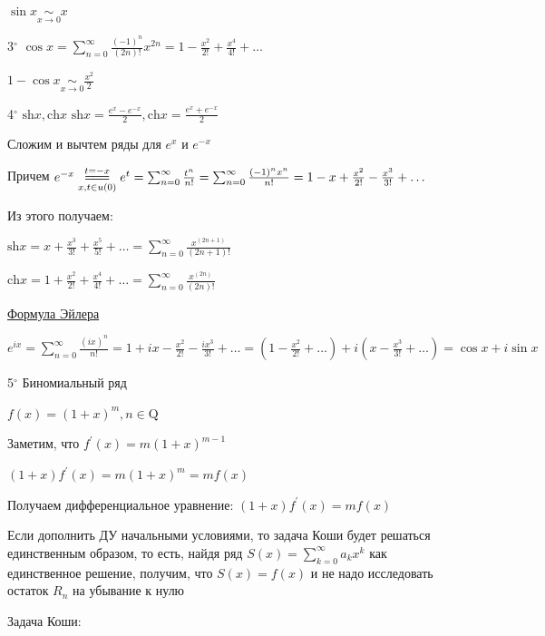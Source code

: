 \documentclass[12pt]{article}
\begin{document}
    \Notas $\sin x \underset{x \to 0}{\sim} x$

    \mediumvspace

    3$^\circ$ $\cos x = \sum_{n = 0}^\infty \frac{(-1)^n}{(2n)!}x^{2n} = 1 - \frac{x^2}{2!} + \frac{x^4}{4!} + \dots$

    \Notas $1 - \cos x \underset{x \to 0}{\sim} \frac{x^2}{2}$

    \mediumvspace

    4$^\circ$ $\mathrm{sh} x, \mathrm{ch} x$ \hfill \Defs $\mathrm{sh} x = \frac{e^x - e^{-x}}{2}, \mathrm{ch} x = \frac{e^x + e^{-x}}{2}$
    
    Сложим и вычтем ряды для $e^x$ и $e^{-x}$

    Причем $e^{-x} \underset{x, t \in u(0)}{\overset{t = -x}{=\joinrel=\joinrel=}} e^t = \sum_{n = 0}^\infty \frac{t^n}{n!} = \sum_{n = 0}^\infty \frac{(-1)^n x^n}{n!} = 1 - x + \frac{x^2}{2!} - \frac{x^3}{3!} + \dots$

    Из этого получаем:

    $\mathrm{sh} x = x + \frac{x^3}{3!} + \frac{x^5}{5!} + \dots = \sum_{n = 0}^\infty \frac{x^{(2n + 1)}}{(2n + 1)!}$

    $\mathrm{ch} x = 1 + \frac{x^2}{2!} + \frac{x^4}{4!} + \dots = \sum_{n = 0}^\infty \frac{x^{(2n)}}{(2n)!}$

    \underline{Формула Эйлера}

    $e^{ix} = \sum_{n = 0}^\infty \frac{(ix)^n}{n!} = 1 + ix - \frac{x^2}{2!} - \frac{ix^3}{3!} + \dots = (1 - \frac{x^2}{2!} + \dots) + i(x - \frac{x^3}{3!} + \dots) = \cos x + i\sin x$


    \mediumvspace

    5$^\circ$ Биномиальный ряд

    $f(x) = (1 + x)^m, n \in \mathrm{Q}$

    Заметим, что $f^\prime(x) = m(1 + x)^{m - 1}$

    $(1 + x)f^\prime(x) = m (1 + x)^m = m f(x)$

    Получаем дифференциальное уравнение: $(1 + x)f^\prime(x) = mf(x)$

    \Notas Если дополнить ДУ начальными условиями, то задача Коши будет решаться единственным образом, 
    то есть, найдя ряд $S(x) = \sum_{k = 0}^{\infty} a_k x^k$ как единственное решение,
    получим, что $S(x) = f(x)$ и не надо исследовать остаток $R_n$ на убывание к нулю

    Задача Коши:
\end{document}

